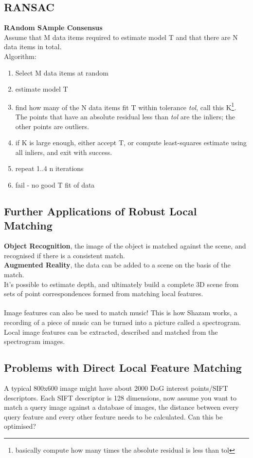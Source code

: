 \documentclass{article}
\begin{document}
	\subsection{RANSAC}
	\textbf{RAndom SAmple Consensus}\\
	Assume that M data items required to estimate model T and that there are N data items in total.\\
	Algorithm:
	\begin{enumerate}
		\item Select M data items at random
		\item estimate model T
		\item find how many of the N data items fit T within tolerance \textit{tol}, call this K\footnote{basically compute how many times the absolute residual is less than tol}. The points that have an absolute residual less than \textit{tol} are the inliers; the other points are outliers.
		\item if K is large enough, either accept T, or compute least-squares estimate using all inliers, and exit with success.
		\item repeat 1..4 n iterations
		\item fail - no good T fit of data
	\end{enumerate}
	\subsection{Further Applications of Robust Local Matching}
	\textbf{Object Recognition}, the image of the object is matched against the scene, and recognised if there is a consistent match.\\
	\textbf{Augmented Reality}, the data can be added to a scene on the basis of the match.\\
	It's possible to estimate depth, and ultimately build a complete 3D scene from sets of point correspondences formed from matching local features.\\
	\\
	Image features can also be used to match music! This is how Shazam works, a recording of a piece of music can be turned into a picture called a spectrogram. Local image features can be extracted, described and matched from the spectrogram images.
	\subsection{Problems with Direct Local Feature Matching}
	A typical 800x600 image might have about 2000 DoG interest points/SIFT descriptors. Each SIFT descriptor is 128 dimensions, now assume you want to match a query image against a database of images, the distance between every query feature and every other feature needs to be calculated. Can this be optimised?
\end{document}
